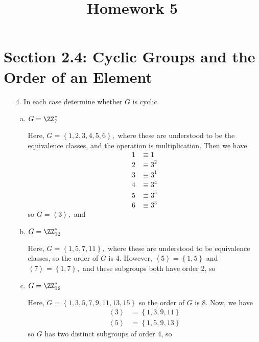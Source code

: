 \documentclass{article}
\begin{document}
\title{Homework 5}
\maketitle
\thispagestyle{fancy}

\section*{Section 2.4: Cyclic Groups and the Order of an Element}
\begin{itemize}
	\item[4.] In each case determine whether $G$ is cyclic.
		\begin{enumerate}[(a)]
			\item $G=\ZZ_7^*$
				\begin{soln}
					Here, $G=\left\{ 1, 2, 3, 4, 5, 6 \right\},$ where these are understood to be the equivalence classes, and the operation is multiplication. Then we have
					\begin{align*}
						1 &\equiv 1 \\
						2 &\equiv 3^2 \\
						3 &\equiv 3^1 \\
						4 &\equiv 3^4 \\
						5 &\equiv 3^5 \\
						6 &\equiv 3^3
					\end{align*} so $G=\left< 3\right>,$ and 
					
				\end{soln}

			\item $G=\ZZ_{12}^*$
				\begin{soln}
					Here, $G=\left\{ 1, 5, 7, 11 \right\},$ where these are understood to be equivalence classes, so the order of $G$ is 4. However, $\left< 5\right>=\left\{ 1, 5 \right\}$ and $\left< 7\right>=\left\{ 1, 7 \right\},$ and these subgroups both have order 2, so \boxed{G\text{ is not cyclic.}}
					
				\end{soln}

			\item $G=\ZZ_{16}^*$
				\begin{soln}
					Here, $G=\left\{ 1, 3, 5, 7, 9, 11, 13, 15 \right\}$ so the order of $G$ is 8. Now, we have
					\begin{align*}
						\left< 3\right> &= \left\{ 1, 3, 9, 11 \right\} \\
						\left< 5\right> &= \left\{ 1, 5, 9, 13 \right\}
					\end{align*} so $G$ has two distinct subgroups of order 4, so 
					

\end{soln}
\end{enumerate}
\end{itemize}
\end{document}
